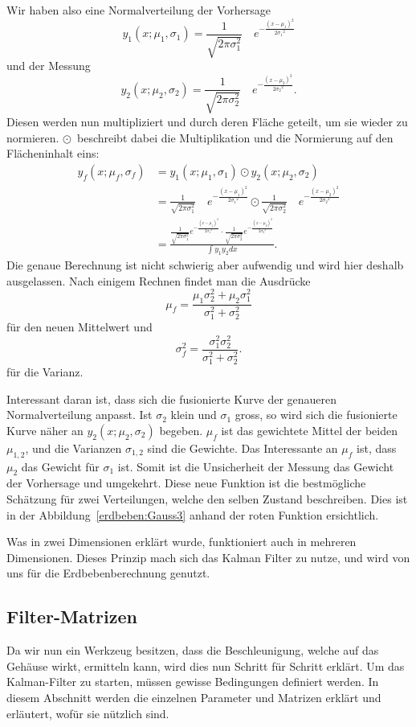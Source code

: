 Wir haben also eine Normalverteilung der Vorhersage
\[ 
{y_1}(x;{\mu_1},{\sigma_1})=\frac{1}{\sqrt{2\pi\sigma_1^2}}\quad e^{-\frac{(x-{\mu_1})^2}{2{\sigma_1}^2}} 
\]
und der Messung
\[ 
{y_2}(x;{\mu_2},{\sigma_2})=\frac{1}{\sqrt{2\pi\sigma_2^2}}\quad e^{-\frac{(x-{\mu_2})^2}{2{\sigma_2}^2}}.
\]
Diesen werden nun multipliziert und durch deren Fläche geteilt,
um sie wieder zu normieren.
$\odot$~beschreibt dabei die Multiplikation und die Normierung auf den Flächeninhalt eins:
\begin{align*}
	{y_f}(x; {\mu_f}, {\sigma_f}) 
	&=
	 {y_1}(x;{ \mu_1},{ \sigma_1}) \odot {y_2}(x; {\mu_2}, {\sigma_2})
	\\
	&=
	\frac{1}{\sqrt{2\pi\sigma_1^2}}\quad e^{-\frac{(x-{\mu_1})^2}{2{\sigma_1}^2}} \odot \frac{1}{\sqrt{2\pi\sigma_2^2}}\quad e^{-\frac{(x-{\mu_2})^2}{2{\sigma_2}^2}}
	\\
	&=
	\frac{ \frac{1}{\sqrt{2\pi\sigma_1^2}}e^{-\frac{(x-{\mu_1})^2}{2{\sigma_1}^2}} \cdot \frac{1}{\sqrt{2\pi\sigma_2^2}}e^{-\frac{(x-{\mu_2})^2}{2{\sigma_2}^2}}}{\int {y_1} {y_2} dx}.
\end{align*}
Die genaue Berechnung ist nicht schwierig aber aufwendig und wird hier deshalb ausgelassen.
Nach einigem Rechnen findet man die Ausdrücke
\[ \mu_f = \frac{\mu_1\sigma_2^2 + \mu_2 \sigma_1^2}{\sigma_1^2 + \sigma_2^2} \]
für den neuen Mittelwert und
\[
\sigma_f^2 = \frac{\sigma_1^2 \sigma_2^2}{\sigma_1^2 + \sigma_2^2}.
\]
für die Varianz.

Interessant daran ist, dass sich die fusionierte Kurve der genaueren Normalverteilung anpasst.
Ist ${\sigma_2}$ klein und ${\sigma_1}$ gross,
so wird sich die fusionierte Kurve näher an ${y_2}(x;{\mu_2},{\sigma_2})$ begeben.
$\mu_f$ ist das gewichtete Mittel der beiden $\mu_{1,2}$, und die Varianzen $\sigma_{1,2}$ sind die Gewichte.
Das Interessante an $\mu_{f}$ ist, dass ${\mu_2}$ das Gewicht für ${\sigma_1}$ ist. 
Somit ist die Unsicherheit der Messung das Gewicht der Vorhersage und umgekehrt.
Diese neue Funktion ist die bestmögliche Schätzung für zwei Verteilungen, welche den selben Zustand beschreiben.
Dies ist in der Abbildung~\ref{erdbeben:Gauss3} anhand der roten Funktion ersichtlich. 

Was in zwei Dimensionen erklärt wurde, funktioniert auch in mehreren Dimensionen. 
Dieses Prinzip mach sich das Kalman Filter zu nutze, und wird von uns für die Erdbebenberechnung genutzt. 

\subsection{Filter-Matrizen}
Da wir nun ein Werkzeug besitzen, dass die Beschleunigung, welche auf das Gehäuse wirkt, ermitteln kann,
wird dies nun Schritt für Schritt erklärt. 
Um das Kalman-Filter zu starten, müssen gewisse Bedingungen definiert werden. 
In diesem Abschnitt werden die einzelnen Parameter und Matrizen erklärt und erläutert, wofür sie nützlich sind. 

